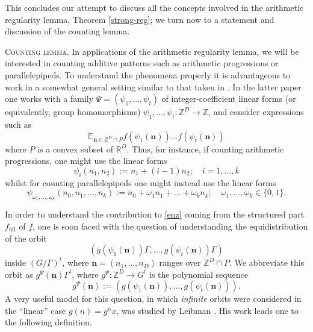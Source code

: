 \documentclass[11pt,reqno]{amsart}
\numberwithin{equation}{section}
\theoremstyle{plain}
\theoremstyle{definition}
\newcommand\E{{\mathbb{E}}}
\newcommand\Z{\mathbb{Z}}
\newcommand\R{\mathbb{R}}
\newcommand\1{{\bf 1}}
\newcommand\2{{\bf 2}}
\newcommand\nil{{\operatorname{nil}}}
\begin{document}
This concludes our attempt to discuss all the concepts involved in the arithmetic regularity lemma, Theorem \ref{strong-reg}; we turn now to a statement and discussion of the counting lemma.\vspace{11pt}

\textsc{Counting lemma.} In applications of the arithmetic regularity lemma, we will be interested in counting additive patterns such as arithmetic progressions or parallelepipeds.
To understand the phenomena properly it is advantageous to work in a somewhat general setting similar to that taken in \cite{gowers-wolf-1,gowers-wolf-2,gowers-wolf-3,green-tao-linearprimes}. In the latter paper one works with a family $\Psi = (\psi_1,\ldots,\psi_t)$ of integer-coefficient linear forms (or equivalently, group homomorphisms) $\psi_1,\ldots,\psi_t: \Z^D \to \Z$, and consider expressions such as
\begin{equation}\label{enz}
\E_{\mathbf{n} \in \Z^D \cap P} f( \psi_1(\mathbf{n}) ) \ldots f( \psi_t(\mathbf{n}) )
\end{equation}
where $P$ is a convex subset of $\R^D$.  Thus, for instance, if counting arithmetic progressions, one might use the linear forms
\begin{equation}\label{hp-lattice} 
\psi_i(n_1,n_2) := n_1 + (i-1) n_2; \quad i=1,\ldots,k
\end{equation}
whilst for counting parallelepipeds one might instead use the linear forms
\begin{equation}\label{hk-lattice} 
\psi_{\omega_1,\ldots,\omega_k}(n_0,n_1,\ldots,n_k) := n_0+\omega_1n_1+\ldots+\omega_kn_k; \quad \omega_1,\ldots,\omega_k \in \{0,1\}.\end{equation}

In order to understand the contribution to \eqref{enz} coming from the structured part $f_\nil$ of $f$, one is soon faced with the question of understanding the equidistribution of the orbit
\begin{equation}\label{v-orbit} (g(\psi_1(\mathbf{n})) \Gamma,\dots, g(\psi_t(\mathbf{n})) \Gamma)\end{equation} 
inside $(G/\Gamma)^t$, where $\mathbf{n} = (n_1,\ldots,n_D)$ ranges over $\Z^D \cap P$. We abbreviate this orbit as $g^\Psi({\mathbf n}) \Gamma^t$, where $g^\Psi: \Z^D \to G^t$ is the polynomial sequence
\begin{equation}\label{gpsi-def}
g^\Psi({\mathbf n}) := (g(\psi_1(\mathbf{n})),\dots, g(\psi_t(\mathbf{n}))).
\end{equation}
A very useful model for this question, in which \emph{infinite} orbits were considered in the ``linear'' case $g(n) = g^nx$, was studied by Leibman \cite{leibman-orb-diag}.  His work leads one to the following definition.
\end{document}
